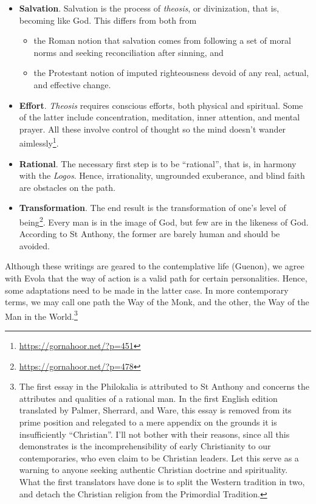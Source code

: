 \begin{itemize}


\item \textbf{Salvation}. Salvation is the process of \emph{theosis}, or divinization, that is, becoming like God. This differs from both from

  \begin{itemize}

\item the Roman notion that salvation comes from following a set of moral norms and seeking reconciliation after sinning, and
  
\item the Protestant notion of imputed righteousness devoid of any real, actual, and effective change.
  \end{itemize}


\item \textbf{Effort}. \emph{Theosis} requires conscious efforts, both physical and spiritual. Some of the latter include concentration, meditation, inner attention, and mental prayer. All these involve control of thought so the mind doesn't wander aimlessly\footnote{\url{https://gornahoor.net/?p=451}}.

\item \textbf{Rational}. The necessary first step is to be ``rational'', that is, in harmony with the \emph{Logos}. Hence, irrationality, ungrounded exuberance, and blind faith are obstacles on the path.

\item \textbf{Transformation}. The end result is the transformation of one's level of being\footnote{\url{https://gornahoor.net/?p=478}}. Every man is in the image of God, but few are in the likeness of God. According to St Anthony, the former are barely human and should be avoided.
\end{itemize}


Although these writings are geared to the contemplative life (Guenon), we agree with Evola that the way of action is a valid path for certain personalities. Hence, some adaptations need to be made in the latter case. In more contemporary terms, we may call one path the Way of the Monk, and the other, the Way of the Man in the World.\footnote{The first essay in the Philokalia is attributed to St Anthony and concerns the attributes and qualities of a rational man. In the first English edition translated by Palmer, Sherrard, and Ware, this essay is removed from its prime position and relegated to a mere appendix on the grounds it is insufficiently ``Christian''. I'll not bother with their reasons, since all this demonstrates is the incomprehensibility of early Christianity to our contemporaries, who even claim to be Christian leaders. Let this serve as a warning to anyone seeking authentic Christian doctrine and spirituality. What the first translators have done is to split the Western tradition in two, and detach the Christian religion from the Primordial Tradition.}



